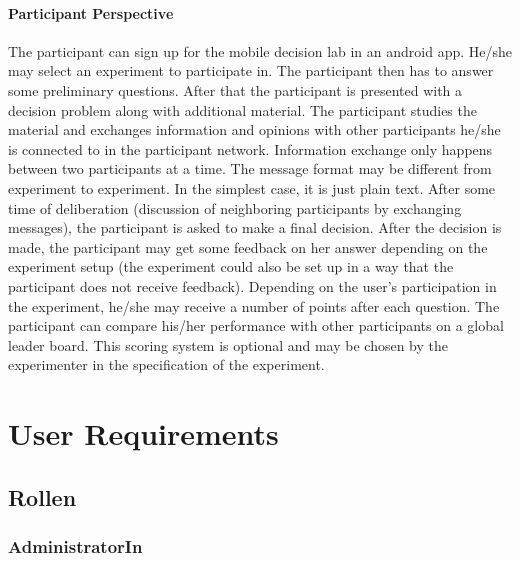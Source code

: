\documentclass[a4paper, 10pt]{scrreprt}
\begin{document}
\subsection{Participant Perspective}
The participant can sign up for the mobile decision lab in an android app. He/she may select an experiment to participate in. The participant then has to answer some preliminary questions. After that the participant is presented with a decision problem along with additional material. The participant studies the material and exchanges information and opinions with other participants he/she is connected to in the participant network. Information exchange only happens between two participants at a time. The message format may be different from experiment to experiment. In the simplest case, it is just plain text. After some time of deliberation (discussion of neighboring participants by exchanging messages), the participant is asked to make a final decision. After the decision is made, the participant may get some feedback on her answer depending on the experiment setup (the experiment could also be set up in a way that the participant does not receive feedback). Depending on the user's participation in the experiment, he/she may receive a number of points after each question. The participant can compare his/her performance with other participants on a global leader board. This scoring system is optional and may be chosen by the experimenter in the specification of the experiment.




\printnoidxglossary[sort=word]




\part{User Requirements}


\chapter{Rollen}

\section{AdministratorIn}
\end{document}
